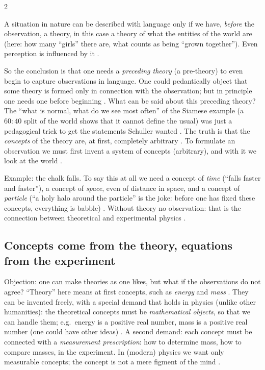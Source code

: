 \begin{paracol}{2}
\begin{intuition}
A situation in nature can be described with language only if we have, \emph{before} the observation, a theory, in
this case a theory of what the entities of the world are (here: how many ``girls'' there are, what counts as being
``grown together''). Even perception is influenced by it .
\end{intuition}
So the conclusion is that one needs a \emph{preceding theory} (a pre-theory) to even begin to capture observations
in language. One could pedantically object that some theory is formed only in connection with the observation; but in
principle one needs one before beginning . What can be said about this
preceding theory? The ``what is normal, what do we see most often'' of the Siamese example (a $60:40$ split of the
world shows that it cannot define the usual) was just a pedagogical trick to get the statements Schuller wanted
. The truth is that the \emph{concepts} of the theory are, at first, completely arbitrary
. To formulate an observation we must first invent a system of concepts (arbitrary), and with it we
look at the world .

Example: the chalk falls. To say this at all we need a concept of \emph{time} (``falls faster and faster''), a concept
of \emph{space}, even of distance in space, and a concept of \emph{particle} (``a holy halo around the particle''
is the joke: before one has fixed these concepts, everything is babble) .
Without theory no observation: that is the connection between theoretical and experimental physics
.

\subsection{Concepts come from the theory, equations from the experiment}\label{ssec:bv-concepts}

Objection: one can make theories as one likes, but what if the observations do not agree? ``Theory'' here means at
first concepts, such as \emph{energy} and \emph{mass} . They can be invented freely,
with a special demand that holds in physics (unlike other humanities): the theoretical concepts must be
\emph{mathematical objects}, so that we can handle them; e.g.\ energy is a positive real number, mass is a positive
real number (one could have other ideas) . A second demand: each concept must be
connected with a \emph{measurement prescription}: how to determine mass, how to compare masses, in the experiment.
In (modern) physics we want only measurable concepts; the concept is not a mere figment of the mind
.


\end{paracol}
